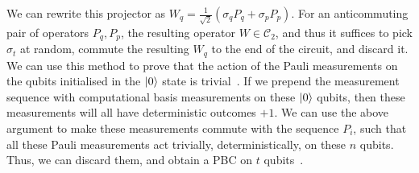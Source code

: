 \documentclass{standalone}
\begin{document}
We can rewrite this projector as $W_{q}=\frac{1}{\sqrt{2}}(\sigma_{q}P_{q}+\sigma_{p}P_{p})$. For an anticommuting pair of operators $P_{q},P_{p}$, the resulting operator $W\in\mathcal{C}_{2}$, and thus it suffices to pick $\sigma_{t}$ at random, commute the resulting $W_{q}$ to the end of the circuit, and discard it.\\
We can use this method to prove that the action of the Pauli measurements on the qubits initialised in the $\ket{0}$ state is trivial~\cite{Bravyi2015}. If we prepend the measurement sequence with computational basis measurements on these $\ket{0}$ qubits, then these measurements will all have deterministic outcomes $+1$. We can use the above argument to make these measurements commute with the sequence $P_{i}$, such that all these Pauli measurements act trivially, deterministically, on these $n$ qubits. Thus, we can discard them, and obtain a PBC on $t$ qubits~\cite{Bravyi2015}. 
\end{document}
